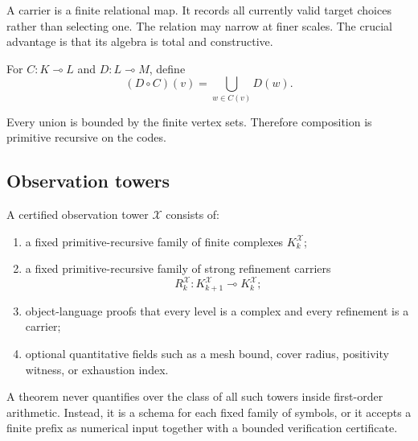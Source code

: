 A carrier is a finite relational map.  It records all currently valid target choices rather than selecting one.  The relation may narrow at finer scales.  The crucial advantage is that its algebra is total and constructive.

\begin{definition}
For $C:K\multimap L$ and $D:L\multimap M$, define
\[
  (D\circ C)(v)=\bigcup_{w\in C(v)}D(w).
\]
\end{definition}

Every union is bounded by the finite vertex sets.  Therefore composition is primitive recursive on the codes.

\subsection{Observation towers}

\begin{definition}
A certified observation tower $\mathcal{X}$ consists of:
\begin{enumerate}
  \item a fixed primitive-recursive family of finite complexes $K^{\mathcal X}_k$;
  \item a fixed primitive-recursive family of strong refinement carriers
  \[
    R^{\mathcal X}_k:K^{\mathcal X}_{k+1}\multimap K^{\mathcal X}_k;
  \]
  \item object-language proofs that every level is a complex and every refinement is a carrier;
  \item optional quantitative fields such as a mesh bound, cover radius, positivity witness, or exhaustion index.
\end{enumerate}
\end{definition}

A theorem never quantifies over the class of all such towers inside first-order arithmetic.  Instead, it is a schema for each fixed family of  symbols, or it accepts a finite prefix as numerical input together with a bounded verification certificate.

\begin{center}
\end{center}

